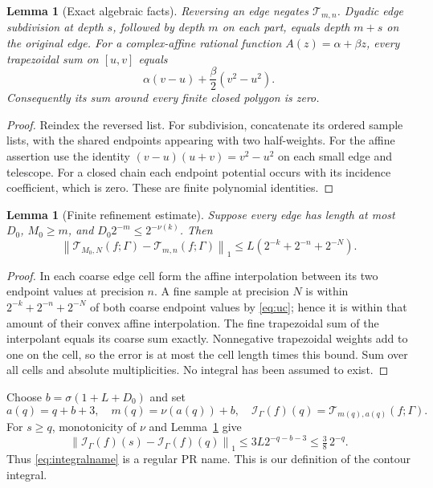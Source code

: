 \documentclass[11pt]{article}
\newtheorem{lemma}[theorem]{Lemma}
\theoremstyle{definition}
\newcommand{\norm}[1]{\left\lVert#1\right\rVert_1}
\newcommand{\trap}{\mathcal T}
\newcommand{\Int}{\mathcal I}
\begin{document}
\begin{lemma}[Exact algebraic facts]\label{lem:algebra}
Reversing an edge negates \(\trap_{m,n}\). Dyadic edge subdivision at
depth \(s\), followed by depth \(m\) on each part, equals depth \(m+s\)
on the original edge. For a complex-affine rational function
\(A(z)=\alpha+\beta z\), every trapezoidal sum on \([u,v]\) equals
\[
 \alpha(v-u)+\frac\beta2(v^2-u^2).
\]
Consequently its sum around every finite closed polygon is zero.
\end{lemma}
\begin{proof}
Reindex the reversed list. For subdivision, concatenate its ordered
sample lists, with the shared endpoints appearing with two half-weights.
For the affine assertion use the identity
\((v-u)(u+v)=v^2-u^2\) on each small edge and telescope. For a closed
chain each endpoint potential occurs with its incidence coefficient,
which is zero. These are finite polynomial identities.
\end{proof}

\begin{lemma}[Finite refinement estimate]\label{lem:quadrature}
Suppose every edge has length at most \(D_0\), \(M_0\ge m\), and
\(D_0 2^{-m}\le2^{-\nu(k)}\). Then
\begin{equation}\label{eq:qerror}
 \norm{\trap_{M_0,N}(f;\Gamma)-\trap_{m,n}(f;\Gamma)}
 \le L(2^{-k}+2^{-n}+2^{-N}).
\end{equation}
\end{lemma}
\begin{proof}
In each coarse edge cell form the affine interpolation between its two
endpoint values at precision \(n\). A fine sample at precision \(N\)
is within \(2^{-k}+2^{-n}+2^{-N}\) of both coarse endpoint values by
\eqref{eq:uc}; hence it is within that amount of their convex affine
interpolation. The fine trapezoidal sum of the interpolant equals its
coarse sum exactly. Nonnegative trapezoidal weights add to one on the
cell, so the error is at most the cell length times this bound.
Sum over all cells and absolute multiplicities. No integral has been
assumed to exist.
\end{proof}

Choose \(b=\sigma(1+L+D_0)\) and set
\begin{equation}\label{eq:integralname}
 a(q)=q+b+3,\quad m(q)=\nu(a(q))+b,\quad
 \Int_\Gamma(f)(q)=\trap_{m(q),a(q)}(f;\Gamma).
\end{equation}
For \(s\ge q\), monotonicity of \(\nu\) and
Lemma~\ref{lem:quadrature} give
\[
 \norm{\Int_\Gamma(f)(s)-\Int_\Gamma(f)(q)}
 \le3L2^{-q-b-3}\le\tfrac38\,2^{-q}.
\]
Thus \eqref{eq:integralname} is a regular PR name. This is our
definition of the contour integral.
\end{document}
